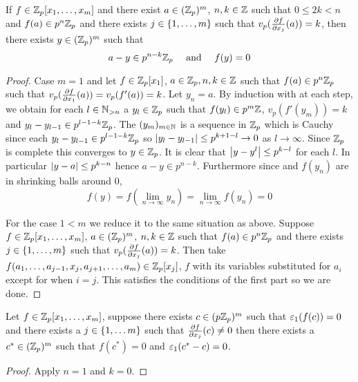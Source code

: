 \begin{prop}
    If $f \in \mathbb{Z}_p[x_1,\dots, x_m]$ and there exist 
    $a \in (\mathbb{Z}_p)^m$,
    $n, k \in \mathbb{Z}$ such that $0 \le 2k < n$ and 
    $f(a) \in p^n \mathbb{Z}_p$
    and there exists $j \in \left\{1, \dots, m\right\}$ such that 
    $v_p (\frac{\partial f}{\partial x_j}(a)) = k$,
    then there exists $y \in (\mathbb{Z}_p)^m$ such that
    \[a - y \in p^{n-k} \mathbb{Z}_p \quad \text{ and } \quad f(y) = 0\]
\end{prop}
\begin{proof}
    Case $m = 1$ and let $f \in \mathbb{Z}_p[x_1]$, 
    $a \in \mathbb{Z}_p, n, k \in \mathbb{Z}$ such that $f(a) \in p^n \mathbb{Z}_p$
    such that 
    $v_p (\frac{\partial f}{\partial x_1}(a)) = v_p(f'(a))= k$.
    Let $y_n = a$.
    By induction with  
    at each step, 
    we obtain for each $l \in \mathbb{N}_{> n}$ a 
    $y_l \in \mathbb{Z}_p$ such that $f(y_l) \in p^{m} \mathbb{Z}$,
    $v_p(f'(y_m)) = k$ and 
    $y_{l} - y_{l-1} \in p^{l-1-k} \mathbb{Z}_p$.
    The $(y_m)_{m \in \mathbb{N}}$ is a sequence in $\mathbb{Z}_p$
    which is Cauchy since each $y_{l} - y_{l-1} \in p^{l-1-k} \mathbb{Z}_p$
    so $\left\vert y_{l} - y_{l-1} \right\vert \le p^{k + 1 - l} \to 0$ 
    as $l \to \infty$.
    Since $\mathbb{Z}_p$ is complete this converges to $y \in \mathbb{Z}_p$.
    It is clear that $\left\vert y - y^{l} \right\vert \le p^{k-l}$
    for each $l$. 
    In particular $\left\vert y - a \right\vert \le p^{k-n}$
    hence $a - y \in p^{n-k}$.
    Furthermore since 
    and $f(y_n)$ are in shrinking balls around $0$,
    \[f(y) = f(\lim_{n \to \infty} y_n) = 
    \lim_{n \to \infty} f(y_n) = 0\]
    
    For the case $1 < m$ 
    we reduce it to the same situation as above.
    Suppose $f \in \mathbb{Z}_p[x_1,\dots, x_m]$,
    $a \in (\mathbb{Z}_p)^m$,
    $n, k \in \mathbb{Z}$ such that $f(a) \in p^n \mathbb{Z}_p$
    and there exists $j \in \left\{1, \dots, m\right\}$ such that 
    $v_p (\frac{\partial f}{\partial x_j}(a)) = k$.
    Then take 
    $f(a_1,\dots, a_{j-1}, x_j, a_{j+1},\dots, a_m) \in \mathbb{Z}_p[x_j]$,
    $f$ with its variables substituted for $a_i$ except for when $i = j$.
    This satisfies the conditions of the first part
    so we are done.
\end{proof}

\begin{cor}[Hensel]
    Let $f \in \mathbb{Z}_p [x_1,\dots,x_m]$, 
    suppose there exists $c \in (p \mathbb{Z}_p)^m$
    such that $\varepsilon_1(f(c)) = 0$ and 
    there exists a $j \in \left\{1,\dots m\right\}$
    such that $\frac{\partial f}{\partial x_j}(c) \ne 0$
    then there exists a $c^* \in (\mathbb{Z}_p)^m$ 
    such that $f(c^*) = 0$ and 
    $\varepsilon_1(c^* - c) = 0$.
\end{cor}
\begin{proof}
    Apply 
    $n = 1$ and $k = 0$.
\end{proof}

